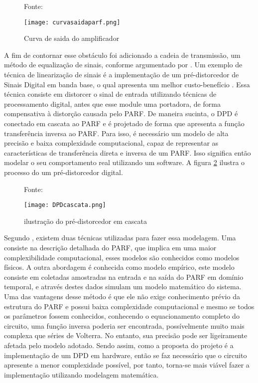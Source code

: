 \begin{figure}[ht!]
    \centering
    \captionsetup{justification=centering}
    \caption*{Fonte: \cite{Chavez2018}}
    \texttt{[image: curvasaidaparf.png]}
    \caption{Curva de saida do amplificador}
    \label{fig:saidaparf}
\end{figure}

A fim de contornar esse obstáculo foi adicionado a cadeia de transmissão, um método de equalização de sinais, conforme argumentado por \cite{Kenington2000}. Um exemplo de técnica de linearização de sinais é a implementação de um pré-distorcedor de Sinais Digital em banda base, o qual apresenta um melhor custo-benefício \cite{Kenington2000}. Essa técnica consiste em distorcer o sinal de entrada utilizando técnicas de processamento digital, antes que esse module uma portadora, de forma compensativa à distorção causada pelo PARF. De maneira sucinta, o DPD é conectado em cascata ao PARF e é projetado de forma que apresenta a função transferência inversa ao PARF. Para isso, é necessário um modelo de alta precisão e baixa complexidade computacional, capaz de representar as características de transferência direta e inversa de um PARF. Isso significa então modelar o seu comportamento real utilizando um software.  A figura \ref{fig:cascatadpd} ilustra o processo do um pré-distorcedor digital.

\begin{figure}[h!]
    \centering
    \captionsetup{justification=centering}
    \caption*{Fonte: \cite{Chavez2018}}
    \texttt{[image: DPDcascata.png]}
    \caption{ilustração do pré-distorcedor em cascata}
    \label{fig:cascatadpd}
\end{figure}

Segundo \cite{John2016}, existem duas técnicas utilizadas para fazer essa modelagem. Uma consiste na descrição detalhada do PARF, que implica em uma maior complexibilidade computacional, esses modelos são conhecidos como modelos físicos. A outra abordagem é conhecida como modelo empírico, este modelo consiste em coletadas amostradas na entrada e na saída do PARF em domínio temporal, e através destes dados simulam um modelo matemático do sistema. Uma das vantagens desse método é que ele não exige conhecimento prévio da estrutura do PARF e possui baixa complexidade computacional e mesmo se todos os parâmetros fossem conhecidos, conhecendo o equacionamento completo do circuito, uma função inversa poderia ser encontrada, possívelmente muito mais complexa que séries de Volterra. No entanto, sua precisão pode ser ligeiramente afetada pelo modelo adotado. 
Sendo assim, como a proposta do projeto é a implementação de um DPD em hardware, então se faz necessário que o circuito apresente a menor complexidade possível, por tanto, torna-se mais viável fazer a implementação utilizando modelagem matemática. 

